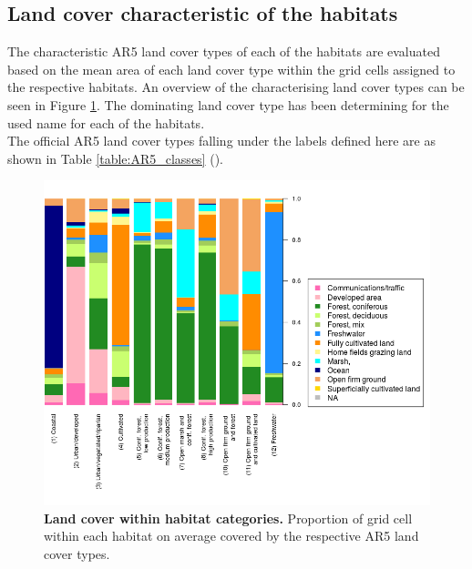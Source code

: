 \documentclass{article}
\begin{document}
\newpage
\subsection{Land cover characteristic of the habitats} \label{sec:Landcover_clusters}
The characteristic AR5 land cover types of each of the habitats are evaluated based on the mean area of each land cover type within the grid cells assigned to the respective habitats. An overview of the characterising land cover types can be seen in Figure \ref{fig:spineplot}. The dominating land cover type has been determining for the used name for each of the habitats.\\
The official AR5 land cover types falling under the labels defined here are as shown in Table \ref{table:AR5_classes} (\cite{Ahlstr2014}).

\begin{figure}[!htb] 
    \centering
    \includegraphics[width=1\textwidth]{spineplot.png}
    \caption{\textbf{Land cover within habitat categories.} Proportion of grid cell within each habitat on average covered by the respective AR5 land cover types.}
    \label{fig:spineplot}
\end{figure}
\end{document}
